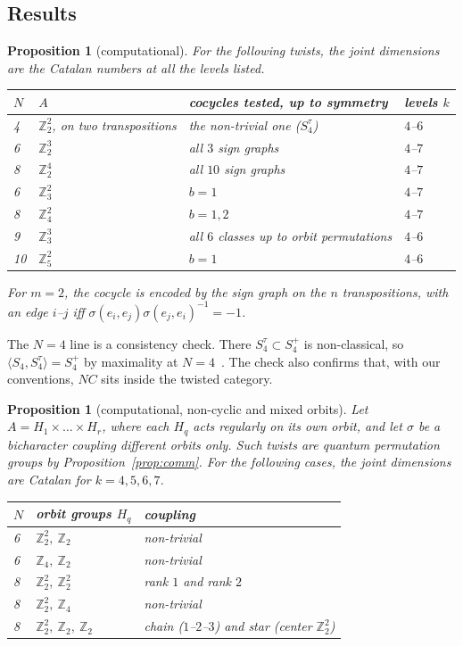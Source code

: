 \documentclass[11pt]{amsart}
\newtheorem{proposition}[theorem]{Proposition}
\theoremstyle{definition}
\theoremstyle{remark}
\theoremstyle{plain}
\numberwithin{equation}{section}
\numberwithin{table}{section}
\newcommand{\Z}{\mathbb Z}
\begin{document}
\subsection{Results}

\begin{proposition}[computational]\label{prop:twres}
For the following twists, the joint dimensions are the Catalan numbers at all the levels listed.
\begin{center}
\begin{tabular}{@{}llll@{}}\toprule
$N$ & $A$ & cocycles tested, up to symmetry & levels $k$\\\midrule
4 & $\Z_2^2$, on two transpositions & the non-trivial one ($S_4^\tau$) & $4$--$6$\\
6 & $\Z_2^3$ & all $3$ sign graphs & $4$--$7$\\
8 & $\Z_2^4$ & all $10$ sign graphs & $4$--$7$\\
6 & $\Z_3^2$ & $b=1$ & $4$--$7$\\
8 & $\Z_4^2$ & $b=1,2$ & $4$--$7$\\
9 & $\Z_3^3$ & all $6$ classes up to orbit permutations & $4$--$6$\\
10 & $\Z_5^2$ & $b=1$ & $4$--$6$\\\bottomrule
\end{tabular}
\end{center}
For $m=2$, the cocycle is encoded by the \emph{sign graph} on the $n$ transpositions, with an edge $i$--$j$ iff $\sigma(e_i,e_j)\sigma(e_j,e_i)^{-1}=-1$.
\end{proposition}

The $N=4$ line is a consistency check. There $S_4^\tau\subset S_4^+$ is non-classical, so $\langle S_4,S_4^\tau\rangle=S_4^+$ by maximality at $N=4$~\cite{bb}. The check also confirms that, with our conventions, $NC$ sits inside the twisted category.

\begin{proposition}[computational, non-cyclic and mixed orbits]\label{prop:twklein}
Let $A=H_1\times\dots\times H_r$, where each $H_q$ acts regularly on its own orbit, and let $\sigma$ be a bicharacter coupling different orbits only. Such twists are quantum permutation groups by Proposition~\ref{prop:comm}. For the following cases, the joint dimensions are Catalan for $k=4,5,6,7$.
\begin{center}
\begin{tabular}{@{}lll@{}}\toprule
$N$ & orbit groups $H_q$ & coupling\\\midrule
6 & $\Z_2^2,\ \Z_2$ & non-trivial\\
6 & $\Z_4,\ \Z_2$ & non-trivial\\
8 & $\Z_2^2,\ \Z_2^2$ & rank $1$ and rank $2$\\
8 & $\Z_2^2,\ \Z_4$ & non-trivial\\
8 & $\Z_2^2,\ \Z_2,\ \Z_2$ & chain ($1$--$2$--$3$) and star (center $\Z_2^2$)\\\bottomrule
\end{tabular}
\end{center}
\end{proposition}
\end{document}

